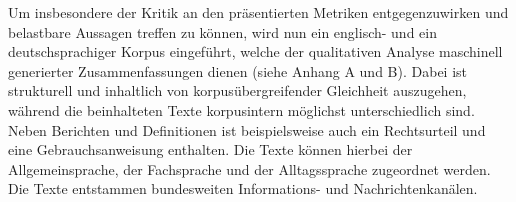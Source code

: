 \noindent
Um insbesondere der Kritik an den präsentierten Metriken entgegenzuwirken und belastbare Aussagen treffen zu können, wird nun ein englisch- und ein deutschsprachiger Korpus eingeführt, welche der qualitativen Analyse maschinell generierter Zusammenfassungen dienen (siehe Anhang A und B). Dabei ist strukturell und inhaltlich von korpusübergreifender Gleichheit auszugehen, während die beinhalteten Texte korpusintern möglichst unterschiedlich sind. Neben Berichten und Definitionen ist beispielsweise auch ein Rechtsurteil und eine Gebrauchsanweisung enthalten. Die Texte können hierbei der Allgemeinsprache, der Fachsprache und der Alltagssprache zugeordnet werden. Die Texte entstammen bundesweiten Informations- und Nachrichtenkanälen.
